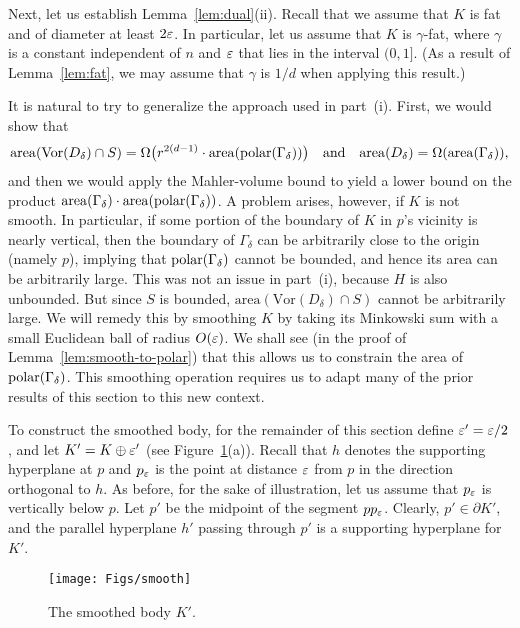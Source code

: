 \documentclass[11pt]{article}   \usepackage[letterpaper,hmargin=2.1cm,vmargin=3cm]{geometry}
\newcommand{\area}{\mathrm{area}}
\newcommand{\Vor}{\mathrm{Vor}}
\begin{document}
\bigskip

Next, let us establish Lemma~\ref{lem:dual}(ii). Recall that we assume that $K$ is fat and of diameter at least $2 \varepsilon$. In particular, let us assume that $K$ is $\gamma$-fat, where $\gamma$ is a constant independent of $n$ and $\varepsilon$ that lies in the interval $(0,1]$. (As a result of Lemma~\ref{lem:fat}, we may assume that $\gamma$ is $1/d$ when applying this result.)

It is natural to try to generalize the approach used in part~(i). First, we would show that 
\[
	\area(\Vor(D_{\delta}) \cap S) = \Omega\big(r^{2(d-1)} \cdot \area(\polar{\Gamma_{\delta}})\big)
	\quad\hbox{and}\quad
	\area(D_{\delta}) = \Omega(\area(\Gamma_{\delta})),
\]
and then we would apply the Mahler-volume bound to yield a lower bound on the product $\area(\Gamma_{\delta}) \cdot \area(\polar{\Gamma_{\delta}})$. A problem arises, however, if $K$ is not smooth. In particular, if some portion of the boundary of $K$ in $p$'s vicinity is nearly vertical, then the boundary of $\Gamma_{\delta}$ can be arbitrarily close to the origin (namely $p$), implying that $\mathrm{polar}(\Gamma_{\delta})$ cannot be bounded, and hence its area can be arbitrarily large. This was not an issue in part~(i), because $H$ is also unbounded. But since $S$ is bounded, $\area(\Vor(D_{\delta}) \cap S)$ cannot be arbitrarily large. We will remedy this by smoothing $K$ by taking its Minkowski sum with a small Euclidean ball of radius $O(\varepsilon)$. We shall see (in the proof of Lemma~\ref{lem:smooth-to-polar}) that this allows us to constrain the area of $\mathrm{polar}(\Gamma_{\delta})$. This smoothing operation requires us to adapt many of the prior results of this section to this new context.

To construct the smoothed body, for the remainder of this section define $\varepsilon' = \varepsilon/2$, and let $K' = K \oplus \varepsilon'$ (see Figure~\ref{fig:smooth}(a)). Recall that $h$ denotes the supporting hyperplane at $p$ and $p_{\varepsilon}$ is the point at distance $\varepsilon$ from $p$ in the direction orthogonal to $h$. As before, for the sake of illustration, let us assume that $p_{\varepsilon}$ is vertically below $p$. Let $p'$ be the midpoint of the segment $p p_{\varepsilon}$. Clearly, $p' \in \partial K'$, and the parallel hyperplane $h'$ passing through $p'$ is a supporting hyperplane for $K'$.

\begin{figure}[htbp]
  \centerline{\texttt{[image: Figs/smooth]}}
  \caption{The smoothed body $K'$.}
  \label{fig:smooth}
\end{figure}
\end{document}
